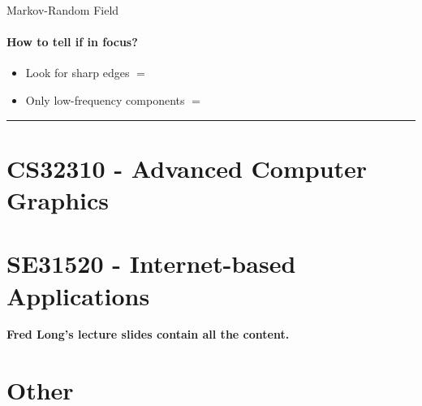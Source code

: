 \documentclass[paper=a4, fontsize=11pt]{article} %
\numberwithin{equation}{section} %
\numberwithin{figure}{section} %
\numberwithin{table}{section} %
\begin{document}
Markov-Random Field

\paragraph{How to tell if in focus?}
\begin{itemize}
\item Look for sharp edges $=$ \checkmark
\item Only low-frequency components $=$ 
\end{itemize}

\rule{\textwidth}{1pt}


\section{CS32310 - Advanced Computer Graphics}


\section{SE31520 - Internet-based Applications}

\textbf{Fred Long's lecture slides contain all the content.}



\section{Other}

\end{document}
